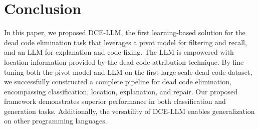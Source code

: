 \documentclass[11pt]{article}
\begin{document}
\section{Conclusion}

In this paper, we proposed DCE-LLM, the first learning-based solution for the dead code elimination task that leverages a pivot model for filtering and recall, and an LLM for explanation and code fixing. The LLM is empowered with location information provided by the dead code attribution technique.
By fine-tuning both the pivot model and LLM on the first large-scale dead code dataset, we successfully constructed a complete pipeline for dead code elimination, encompassing classification, location, explanation, and repair. Our proposed framework demonstrates superior performance in both classification and generation tasks. Additionally, the versatility of DCE-LLM enables generalization on other programming languages.








\end{document}
